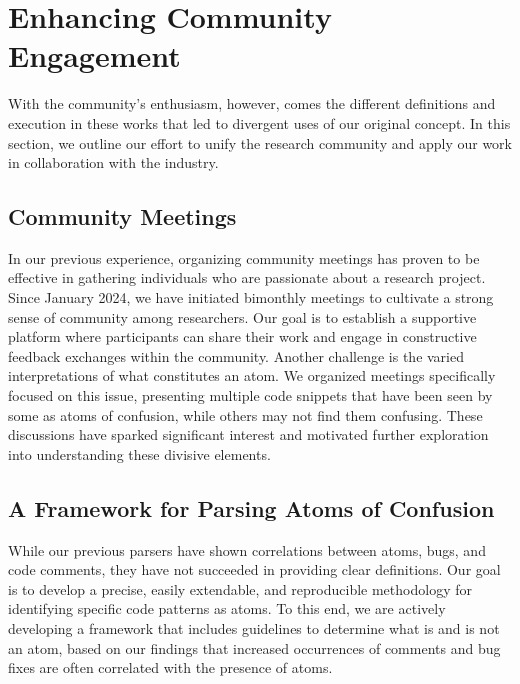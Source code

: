 \documentclass[conference]{IEEEtran}
\begin{document}
\section{Enhancing Community Engagement}

With the community's enthusiasm, however, comes the different definitions and execution in these works that led to divergent uses of our original concept. In this section, we outline our effort to unify the research community and apply our work in collaboration with the industry.

\subsection{Community Meetings}
In our previous experience, organizing community meetings has 
proven to be effective in gathering individuals who 
are passionate about a research project. 
Since January 2024, we have initiated bimonthly meetings 
to cultivate a strong sense of community among researchers. 
Our goal is to establish 
a supportive platform where  participants can share 
their work and engage in constructive feedback exchanges 
within the community.
%
%
Another challenge is the varied interpretations 
of what constitutes an atom. We organized 
meetings specifically focused on this issue, presenting 
multiple code snippets that have been seen by some as atoms of 
confusion, while others may not find them confusing. These 
discussions have sparked significant interest and motivated 
further exploration into understanding these divisive 
elements.


\subsection{A Framework for Parsing Atoms of Confusion}

While our previous parsers \cite{gopstein2018prevalence} 
have shown correlations between atoms, bugs, and 
code comments, they have not succeeded in providing clear 
definitions. Our goal is to develop a precise, easily 
extendable, and reproducible methodology for identifying
specific code patterns as atoms. To this end, we are actively 
developing a framework that includes guidelines 
to determine what is and is not an atom, based on our findings that increased occurrences of 
comments and bug fixes are often correlated with the presence of atoms. 
\end{document}
